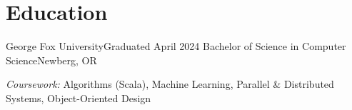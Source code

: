 \section{Education}
  \resumeSubHeadingListStart
    \resumeSubheading
        {George Fox University}{Graduated April 2024}
        {Bachelor of Science in Computer Science}{Newberg, OR}
        {\item{\small{\textit{Coursework:} Algorithms (Scala), Machine Learning, Parallel \& Distributed Systems, Object-Oriented Design}}}
  \resumeSubHeadingListEnd
